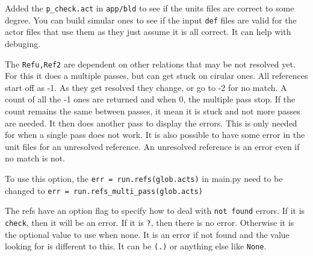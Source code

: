 \documentclass[11pt]{article}
\begin{document}
Added the \texttt{p\_check.act} in \texttt{app/bld} to see if the units
files are correct to some degree. You can build simular ones to see if
the input \texttt{def} files are valid for the actor files that use them
as they just assume it is all correct. It can help with debuging.

The \texttt{Refu,Ref2} are dependent on other relations that may be not
resolved yet. For this it does a multiple passes, but can get stuck on
cirular ones. All references start off as -1. As they get resolved they
change, or go to -2 for no match. A count of all the -1 ones are
returned and when 0, the multiple pass stop. If the count remains the
same between passes, it mean it is stuck and not more passes are needed.
It then does another pass to display the errors. This is only needed for
when a single pass does not work. It is also possible to have some error
in the unit files for an unresolved reference. An unresolved reference
is an error even if no match is not.

To use this option, the \texttt{err\ =\ run.refs(glob.acts)} in main.py
need to be changed to \texttt{err\ =\ run.refs\_multi\_pass(glob.acts)}

The refs have an option flag to specify how to deal with
\texttt{not\ found} errors. If it is \texttt{check}, then it will be an
error. If it is \texttt{?}, then there is no error. Otherwise it is the
optional value to use when none. It is an error if not found and the
value looking for is different to this. It can be \texttt{(.)} or
anything else like \texttt{None}.
\end{document}
